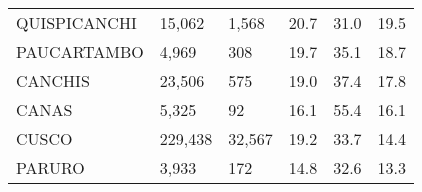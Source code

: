 \begin{tabular}{llllll}
	\cellcolor[HTML]{FF5050}QUISPICANCHI                           & 15,062                                                                & 1,568                                                            & 20.7                                                                             & 31.0                                                                        & 19.5                                                                                \\
	\cellcolor[HTML]{FF5050}PAUCARTAMBO                            & 4,969                                                                 & 308                                                              & 19.7                                                                             & 35.1                                                                        & 18.7                                                                                \\
	\cellcolor[HTML]{FF5050}CANCHIS                                & 23,506                                                                & 575                                                              & 19.0                                                                             & 37.4                                                                        & 17.8                                                                                \\
	\cellcolor[HTML]{FF5050}CANAS                                  & 5,325                                                                 & 92                                                               & 16.1                                                                             & 55.4                                                                        & 16.1                                                                                \\
	\cellcolor[HTML]{F8CBAD}CUSCO                                  & 229,438                                                               & 32,567                                                           & 19.2                                                                             & 33.7                                                                        & 14.4                                                                                \\
	\cellcolor[HTML]{F8CBAD}PARURO                                 & 3,933                                                                 & 172                                                              & 14.8                                                                             & 32.6                                                                        & 13.3                                                                                \\

\end{tabular}
